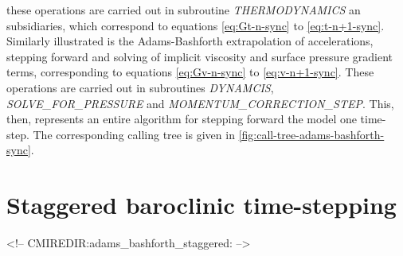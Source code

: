 these operations are carried out in subroutine {\em THERMODYNAMICS} an
subsidiaries, which correspond to equations \ref{eq:Gt-n-sync} to
\ref{eq:t-n+1-sync}.
Similarly illustrated is the Adams-Bashforth extrapolation of
accelerations, stepping forward and solving of implicit viscosity and
surface pressure gradient terms, corresponding to equations
\ref{eq:Gv-n-sync} to \ref{eq:v-n+1-sync}.
These operations are carried out in subroutines {\em DYNAMCIS}, {\em
SOLVE\_FOR\_PRESSURE} and {\em MOMENTUM\_CORRECTION\_STEP}. This, then,
represents an entire algorithm for stepping forward the model one
time-step. The corresponding calling tree is given in
\ref{fig:call-tree-adams-bashforth-sync}.

\section{Staggered baroclinic time-stepping}
\label{sec:adams-bashforth-staggered}
\begin{rawhtml}
<!-- CMIREDIR:adams_bashforth_staggered: -->
\end{rawhtml}


